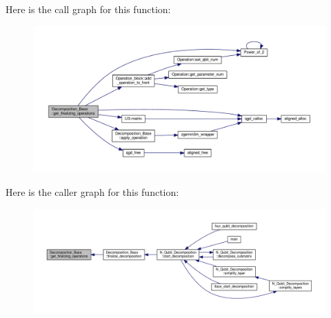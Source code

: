 Here is the call graph for this function\+:
\nopagebreak
\begin{figure}[H]
\begin{center}
\leavevmode
\includegraphics[width=350pt]{class_decomposition___base_a9832cc5308c00b73d3e6bc331a77c7f7_cgraph}
\end{center}
\end{figure}




Here is the caller graph for this function\+:
\nopagebreak
\begin{figure}[H]
\begin{center}
\leavevmode
\includegraphics[width=350pt]{class_decomposition___base_a9832cc5308c00b73d3e6bc331a77c7f7_icgraph}
\end{center}
\end{figure}


